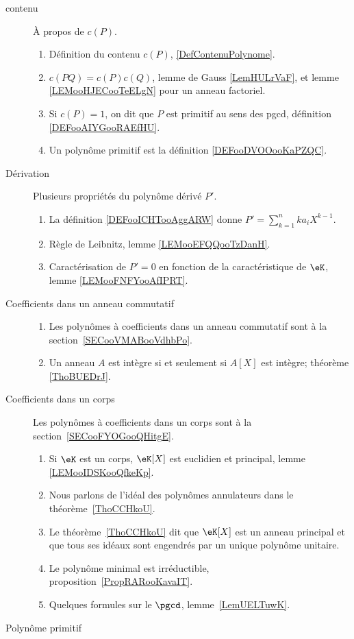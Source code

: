 \begin{description}
	\item[contenu]
		À propos de \( c(P)\).
		\begin{enumerate}
			\item Définition du contenu \( c(P)\), \ref{DefContenuPolynome}.
			\item
			      \( c(PQ)=c(P)c(Q)\), lemme de Gauss \ref{LemHULrVaF}, et lemme \ref{LEMooHJECooTeELgN} pour un anneau factoriel.
			\item
			      Si \( c(P)=1\), on dit que \( P\) est primitif au sens des pgcd, définition \ref{DEFooAIYGooRAEfHU}.
			\item
			      Un polynôme primitif est la définition \ref{DEFooDVOOooKaPZQC}.
		\end{enumerate}

	\item[Dérivation]
		Plusieurs propriétés du polynôme dérivé \( P'\).
		\begin{enumerate}
			\item
			      La définition \ref{DEFooICHTooAggARW} donne \( P'=\sum_{k=1}^nka_iX^{k-1}\).
			\item
			      Règle de Leibnitz, lemme \ref{LEMooEFQQooTzDanH}.
			\item
			      Caractérisation de \( P'=0\) en fonction de la caractéristique de \( \eK\), lemme \ref{LEMooFNFYooAfIPRT}.
		\end{enumerate}

	\item[Coefficients dans un anneau commutatif]

		\begin{enumerate}
			\item
			      Les polynômes à coefficients dans un anneau commutatif  sont à la section~\ref{SECooVMABooVdhbPo}.
			\item
			      Un anneau \( A\) est intègre si et seulement si \( A[X]\) est intègre; théorème \ref{ThoBUEDrJ}.
		\end{enumerate}


	\item[Coefficients dans un corps]
		Les polynômes à coefficients dans un corps sont à la section~\ref{SECooFYOGooQHitgE}.
		\begin{enumerate}
			\item
			      Si \( \eK\) est un corps, \( \eK[X]\) est euclidien et principal, lemme \ref{LEMooIDSKooQfkeKp}.
			\item
			      Nous parlons de l'idéal des polynômes annulateurs dans le théorème~\ref{ThoCCHkoU}.
			\item
			      Le théorème~\ref{ThoCCHkoU} dit que \( \eK[X]\) est un anneau principal et que tous ses idéaux sont engendrés par un unique polynôme unitaire.
			\item
			      Le polynôme minimal est irréductible, proposition~\ref{PropRARooKavaIT}.
			\item
			      Quelques formules sur le \( \pgcd\), lemme~\ref{LemUELTuwK}.
		\end{enumerate}
	\item[Polynôme primitif]


\end{description}
